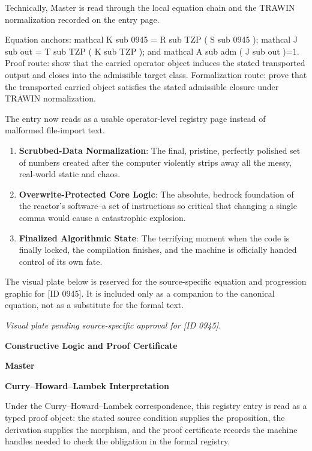 Technically, Master is read through the local equation chain and the TRAWIN normalization recorded on the entry page.

Equation anchors: mathcal K sub 0945 = R sub TZP ( S sub 0945 ); mathcal J sub out = T sub TZP ( K sub TZP ); and mathcal A sub adm ( J sub out )=1. Proof route: show that the carried operator object induces the stated transported output and closes into the admissible target class. Formalization route: prove that the transported carried object satisfies the stated admissible closure under TRAWIN normalization.

The entry now reads as a usable operator-level registry page instead of malformed file-import text.
\endgroup

\begin{enumerate}[leftmargin=1.6em,itemsep=6pt,topsep=4pt]
\item \textbf{Scrubbed-Data Normalization}: The final, pristine, perfectly polished set of numbers created after the computer violently strips away all the messy, real-world static and chaos.
\item \textbf{Overwrite-Protected Core Logic}: The absolute, bedrock foundation of the reactor's software--a set of instructions so critical that changing a single comma would cause a catastrophic explosion.
\item \textbf{Finalized Algorithmic State}: The terrifying moment when the code is finally locked, the compilation finishes, and the machine is officially handed control of its own fate.
\end{enumerate}

\begingroup\footnotesize\sloppy
The visual plate below is reserved for the source-specific equation and progression graphic for [ID 0945]. It is included only as a companion to the canonical equation, not as a substitute for the formal text.
\par\endgroup
\begingroup\footnotesize\itshape
Visual plate pending source-specific approval for [ID 0945].
\par\endgroup

\clearpage
\begingroup\tzpsupportsetup
\noindent\textbf{\fontsize{10.8pt}{12.8pt}\selectfont [ID 0945] Constructive Logic and Proof Certificate}\par
\noindent\textbf{\fontsize{10pt}{12pt}\selectfont Master}\par
\vspace{0.45em}
\begingroup
\footnotesize
\setlength{\parskip}{0.22em}
\setlength{\parindent}{0pt}
\noindent\textbf{Curry--Howard--Lambek Interpretation}\par
Under the Curry--Howard--Lambek correspondence, this registry entry is read as a typed proof
object: the stated source condition supplies the proposition, the derivation supplies the
morphism, and the proof certificate records the machine handles needed to check the obligation
in the formal registry.

